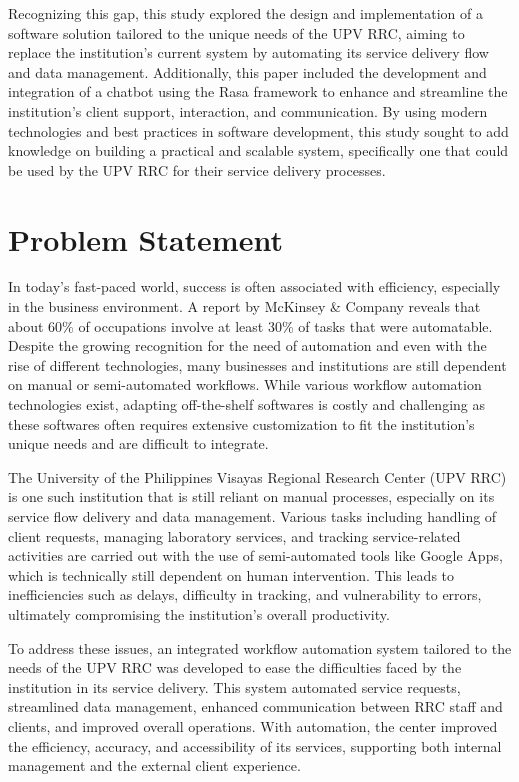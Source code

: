 Recognizing this gap, this study explored the design and implementation of a software solution tailored to the unique needs of the UPV RRC, aiming to replace the institution’s current system by automating its service delivery flow and data management. Additionally, this paper included the development and integration of a chatbot using the Rasa framework to enhance and streamline the institution’s client support, interaction, and communication. By using modern technologies and best practices in software development, this study sought to add knowledge on building a practical and scalable system, specifically one that could be used by the UPV RRC for their service delivery processes.

\section{Problem Statement}

In today’s fast-paced world, success is often associated with efficiency, especially in the business environment. A report by McKinsey \& Company \cite{manyika2017} reveals that about 60\% of occupations involve at least 30\% of tasks that were automatable. Despite the growing recognition for the need of automation and even with the rise of different technologies, many businesses and institutions are still dependent on manual or semi-automated workflows. While various workflow automation technologies exist, adapting off-the-shelf softwares is costly and challenging as these softwares often requires extensive customization to fit the institution’s unique needs and are difficult to integrate. 

The University of the Philippines Visayas Regional Research Center (UPV RRC) is one such institution that is still reliant on manual processes, especially on its service flow delivery and data management. Various tasks including handling of client requests, managing laboratory services, and tracking service-related activities are carried out with the use of semi-automated tools like Google Apps, which is technically still dependent on human intervention. This leads to inefficiencies such as delays, difficulty in tracking, and vulnerability to errors, ultimately compromising the institution’s overall productivity.

To address these issues, an integrated workflow automation system tailored to the needs of the UPV RRC was developed to ease the difficulties faced by the institution in its service delivery. This system automated service requests, streamlined data management, enhanced communication between RRC staff and clients, and improved overall operations. With automation, the center improved the efficiency, accuracy, and accessibility of its services, supporting both internal management and the external client experience.


